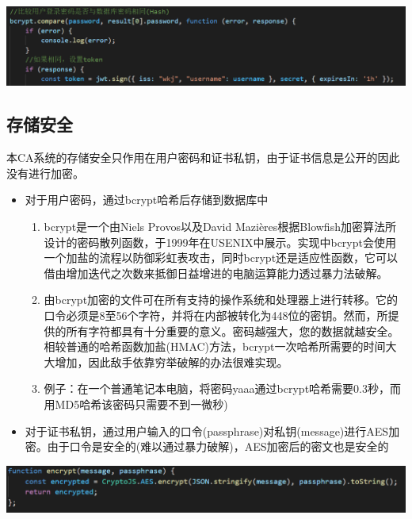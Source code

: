 \documentclass{ctexart}
\begin{document}
\includegraphics[width=\textwidth]{token.PNG}



\subsection{存储安全}
本CA系统的存储安全只作用在用户密码和证书私钥，由于证书信息是公开的因此没有进行加密。



\begin{itemize}
    \item 对于用户密码，通过bcrypt哈希后存储到数据库中
          \begin{enumerate}
              \item bcrypt是一个由Niels Provos以及David Mazières根据Blowfish加密算法所设计的密码散列函数，于1999年在USENIX中展示。实现中bcrypt会使用一个加盐的流程以防御彩虹表攻击，同时bcrypt还是适应性函数，它可以借由增加迭代之次数来抵御日益增进的电脑运算能力透过暴力法破解。
              \item 由bcrypt加密的文件可在所有支持的操作系统和处理器上进行转移。它的口令必须是8至56个字符，并将在内部被转化为448位的密钥。然而，所提供的所有字符都具有十分重要的意义。密码越强大，您的数据就越安全。
                    相较普通的哈希函数加盐(HMAC)方法，bcrypt一次哈希所需要的时间大大增加，因此敌手依靠穷举破解的办法很难实现。
              \item 例子：在一个普通笔记本电脑，将密码yaaa通过bcrypt哈希需要0.3秒，而用MD5哈希该密码只需要不到一微秒)
          \end{enumerate}




    \item 对于证书私钥，通过用户输入的口令(passphrase)对私钥(message)进行AES加密。由于口令是安全的(难以通过暴力破解)，AES加密后的密文也是安全的
\end{itemize}




\includegraphics[width=\textwidth]{Clipboard_2021-01-01-17-31-59.png}
\end{document}
